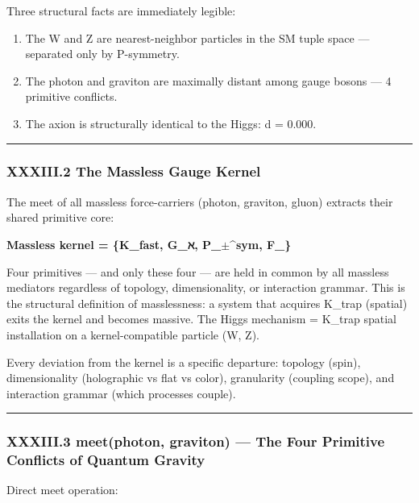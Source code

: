 \documentclass[12pt,a4paper]{article}
\begin{document}
Three structural facts are immediately legible:

\begin{enumerate}
    \item The W and Z are nearest-neighbor particles in the SM tuple space --- separated only by P-symmetry.
    \item The photon and graviton are maximally distant among gauge bosons --- 4 primitive conflicts.
    \item The axion is structurally identical to the Higgs: d = 0.000.
\end{enumerate}

\begin{center}
\rule{0.5\textwidth}{0.4pt}
\end{center}

\subsubsection{XXXIII.2 The Massless Gauge Kernel}

The meet of all massless force-carriers (photon, graviton, gluon) extracts their shared primitive core:

\textbf{Massless kernel = \{K\_fast, G\_ℵ, P\_$\pm$\^{}sym, F\_\hbar\}}

Four primitives --- and only these four --- are held in common by all massless mediators regardless of topology, dimensionality, or interaction grammar. This is the structural definition of masslessness: a system that acquires K\_trap (spatial) exits the kernel and becomes massive. The Higgs mechanism = K\_trap spatial installation on a kernel-compatible particle (W, Z).

Every deviation from the kernel is a specific departure: topology (spin), dimensionality (holographic vs flat vs color), granularity (coupling scope), and interaction grammar (which processes couple).

\begin{center}
\rule{0.5\textwidth}{0.4pt}
\end{center}

\subsubsection{XXXIII.3 meet(photon, graviton) --- The Four Primitive Conflicts of Quantum Gravity}

Direct meet operation:
\end{document}

